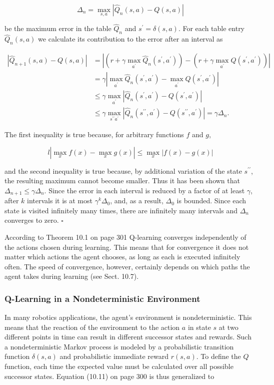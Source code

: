 \documentclass[10pt]{book}
\begin{document}
$$
\Delta_{n}=\max _{s, a}\left|\hat{Q}_{n}(s, a)-Q(s, a)\right|
$$

be the maximum error in the table $\hat{Q}_{n}$ and $s^{\prime}=\delta(s, a)$. For each table entry $\hat{Q}_{n}(s, a)$ we calculate its contribution to the error after an interval as


$$
\begin{aligned}
\left|\hat{Q}_{n+1}(s, a)-Q(s, a)\right| & =\left|\left(r+\gamma \max _{a^{\prime}} \hat{Q}_{n}\left(s^{\prime}, a^{\prime}\right)\right)-\left(r+\gamma \max _{a^{\prime}} Q\left(s^{\prime}, a^{\prime}\right)\right)\right| \\
& =\gamma\left|\max _{a^{\prime}} \hat{Q}_{n}\left(s^{\prime}, a^{\prime}\right)-\max _{a^{\prime}} Q\left(s^{\prime}, a^{\prime}\right)\right| \\
& \leq \gamma \max _{a^{\prime}}\left|\hat{Q}_{n}\left(s^{\prime}, a^{\prime}\right)-Q\left(s^{\prime}, a^{\prime}\right)\right| \\
& \leq \gamma \max _{s^{\prime \prime} a^{\prime}}\left|\hat{Q}_{n}\left(s^{\prime \prime}, a^{\prime}\right)-Q\left(s^{\prime \prime}, a^{\prime}\right)\right|=\gamma \Delta_{n} .
\end{aligned}
$$

The first inequality is true because, for arbitrary functions $f$ and $g$,

$$
l\left|\max _{x} f(x)-\max _{x} g(x)\right| \leq \max _{x}|f(x)-g(x)|
$$

and the second inequality is true because, by additional variation of the state $s^{\prime \prime}$, the resulting maximum cannot become smaller. Thus it has been shown that $\Delta_{n+1} \leq \gamma \Delta_{n}$. Since the error in each interval is reduced by a factor of at least $\gamma$, after $k$ intervals it is at most $\gamma^{k} \Delta_{0}$, and, as a result, $\Delta_{0}$ is bounded. Since each state is visited infinitely many times, there are infinitely many intervals and $\Delta_{n}$ converges to zero. \(\square\)

According to Theorem 10.1 on page 301 Q-learning converges independently of the actions chosen during learning. This means that for convergence it does not matter which actions the agent chooses, as long as each is executed infinitely often. The speed of convergence, however, certainly depends on which paths the agent takes during learning (see Sect. 10.7).

\subsubsection*{Q-Learning in a Nondeterministic Environment}
In many robotics applications, the agent's environment is nondeterministic. This means that the reaction of the environment to the action $a$ in state $s$ at two different points in time can result in different successor states and rewards. Such a nondeterministic Markov process is modeled by a probabilistic transition function $\delta(s, a)$ and probabilistic immediate reward $r(s, a)$. To define the $Q$ function, each time the expected value must be calculated over all possible successor states. Equation (10.11) on page 300 is thus generalized to
\end{document}
